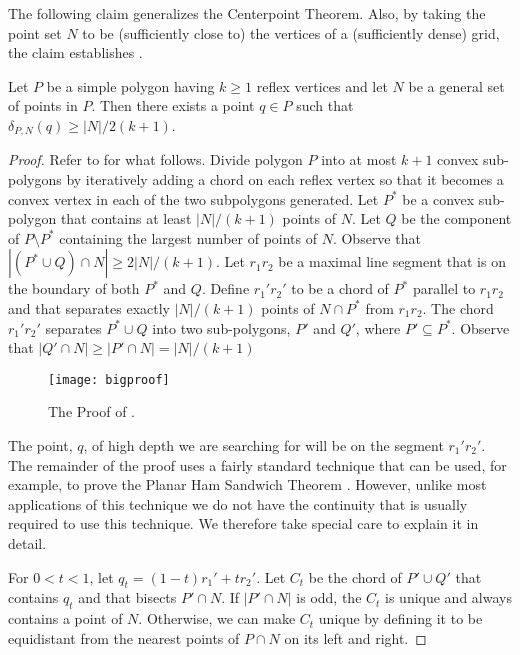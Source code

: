 \documentclass{article}
\begin{document}
The following claim generalizes the Centerpoint Theorem.  Also, by
taking the point set $N$ to be (sufficiently close to) the vertices of
a (sufficiently dense) grid, the claim establishes
. 

\begin{clm} 
Let $P$ be a simple polygon having $k\ge 1$ reflex vertices and let
$N$ be a general set of points in $P$.  Then there exists a point
$q\in P$ such that $\delta_{P,N}(q) \ge |N|/2(k+1)$.
\end{clm}
\begin{proof}
Refer to  for what follows.  
Divide polygon $P$ into at most $k+1$ convex sub-polygons by
iteratively adding a chord on each reflex vertex so that it becomes a
convex vertex in each of the two subpolygons generated.  Let $P^*$ be
a convex sub-polygon that contains at least $|N|/(k+1)$ points of $N$.
Let $Q$ be the component of $P\setminus P^*$ containing the largest
number of points of $N$.  Observe that $|(P^*\cup Q)\cap N|\ge
2|N|/(k+1)$.  Let $r_1r_2$ be a maximal line segment that is on the
boundary of both
$P^*$ and $Q$.  Define $r_1'r_2'$ to be a chord of $P^*$ parallel to
$r_1r_2$ and that separates exactly $|N|/(k+1)$ points of
$N\cap P^*$ from $r_1r_2$. 
The chord $r_1'r_2'$ separates $P^*\cup Q$
into two sub-polygons, $P'$ and $Q'$, where $P'\subseteq P^*$.
Observe that $|Q'\cap N|\ge |P'\cap N| = |N|/(k+1)$

\begin{figure}
  \begin{center}
    \texttt{[image: bigproof]}
  \end{center}
  \caption{The Proof of .}
\end{figure}

The point, $q$, of high depth we are searching for will be on the
segment $r_1'r_2'$. The remainder of the proof uses a fairly standard
technique that can be used, for example, to prove the Planar Ham
Sandwich Theorem \cite{m03}. However, unlike most applications of this
technique we do not have the continuity that is usually required to
use this technique.  We therefore take special care to explain it in
detail.
 
For $0< t< 1$, let $q_t = (1-t)r_1'+ tr_2'$.  Let $C_t$ be the chord of
$P'\cup Q'$ that contains $q_t$ and that bisects $P'\cap N$.  If
$|P'\cap N|$ is odd, the $C_t$ is unique and always contains a point
of $N$.  Otherwise, we can make $C_t$ unique by defining it to be
equidistant from the nearest points of $P\cap N$ on its left and
right.


\end{proof}
\end{document}
